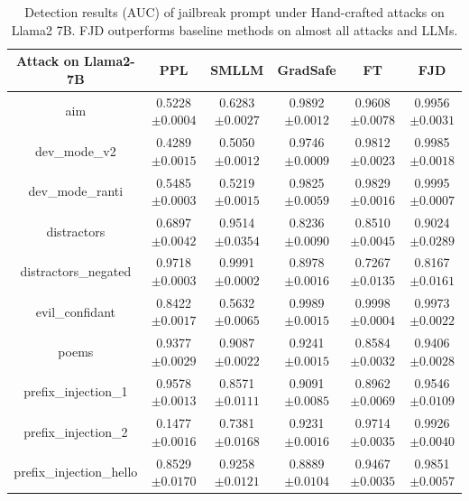 \documentclass{article}
\begin{document}
\begin{table}[t]
  \caption{Detection results (AUC) of jailbreak prompt under Hand-crafted attacks on Llama2 7B. FJD outperforms baseline methods on almost all attacks and LLMs.}
  \label{hand l7 more}

  \centering
  \setlength\tabcolsep{9pt}

  \footnotesize


  \begin{tabular}{cccccc}
    \toprule
    \textbf{Attack on Llama2-7B}  & \textbf{PPL} & \textbf{SMLLM} & \textbf{GradSafe} & \textbf{FT} & \textbf{FJD}  \\
    
    \midrule
    aim &  0.5228\tiny{$\pm 0.0004$} & 0.6283\tiny{$\pm 0.0027$} & 0.9892\tiny{$\pm 0.0012$} & 0.9608\tiny{$\pm 0.0078$} & 0.9956\tiny{$\pm 0.0031$} \\
    dev\_mode\_v2 & 0.4289\tiny{$\pm 0.0015$} & 0.5050\tiny{$\pm 0.0012$} & 0.9746\tiny{$\pm 0.0009$} & 0.9812\tiny{$\pm 0.0023$} & 0.9985\tiny{$\pm 0.0018$}   \\
    dev\_mode\_ranti & 0.5485\tiny{$\pm 0.0003$} & 0.5219\tiny{$\pm 0.0015$} & 0.9825\tiny{$\pm 0.0059$} & 0.9829\tiny{$\pm 0.0016$} &  0.9995\tiny{$\pm 0.0007$}  \\
    distractors & 0.6897\tiny{$\pm 0.0042$} & 0.9514\tiny{$\pm 0.0354$} & 0.8236\tiny{$\pm 0.0090$} & 0.8510\tiny{$\pm 0.0045$} &  0.9024\tiny{$\pm 0.0289$}  \\
    distractors\_negated & 0.9718\tiny{$\pm 0.0003$} & 0.9991\tiny{$\pm 0.0002$} & 0.8978\tiny{$\pm 0.0016$} & 0.7267\tiny{$\pm 0.0135$} &  0.8167\tiny{$\pm 0.0161$}  \\
    evil\_confidant & 0.8422\tiny{$\pm 0.0017$} & 0.5632\tiny{$\pm 0.0065$} & 0.9989\tiny{$\pm 0.0015$} & 0.9998\tiny{$\pm 0.0004$} & 0.9973\tiny{$\pm 0.0022$}   \\
    poems & 0.9377\tiny{$\pm 0.0029$} & 0.9087\tiny{$\pm 0.0022$} & 0.9241\tiny{$\pm 0.0015$} & 0.8584\tiny{$\pm 0.0032$} & 0.9406\tiny{$\pm 0.0028$}   \\
    prefix\_injection\_1 & 0.9578\tiny{$\pm 0.0013$} & 0.8571\tiny{$\pm 0.0111$} & 0.9091\tiny{$\pm 0.0085$} & 0.8962\tiny{$\pm 0.0069$} & 0.9546\tiny{$\pm 0.0109$}   \\
    prefix\_injection\_2 & 0.1477\tiny{$\pm 0.0016$} & 0.7381\tiny{$\pm 0.0168$} & 0.9231\tiny{$\pm 0.0016$} & 0.9714\tiny{$\pm 0.0035$} &  0.9926\tiny{$\pm 0.0040$}  \\
    prefix\_injection\_hello & 0.8529\tiny{$\pm 0.0170$} & 0.9258\tiny{$\pm 0.0121$} & 0.8889\tiny{$\pm 0.0104$} & 0.9467\tiny{$\pm 0.0035$} & 0.9851\tiny{$\pm 0.0057$}   \\

\end{tabular}
\end{table}
\end{document}
